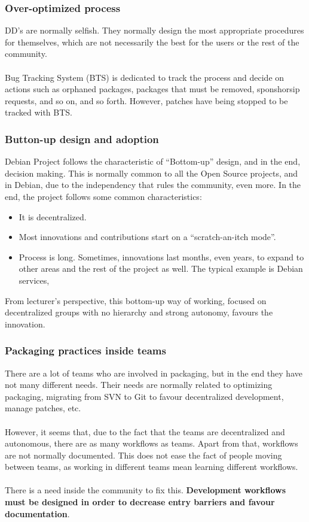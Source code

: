 \documentclass[11pt]{article}
\begin{document}
\subsubsection{Over-optimized process}
DD's are normally selfish. They normally design the most appropriate procedures for themselves, which are not necessarily the best for the users or the rest of the community.\\
\\
Bug Tracking System (BTS) is dedicated to track the process and decide on actions such as orphaned packages, packages that must be removed, sponshorsip requests, and so on, and so forth. However, patches have being stopped to be tracked with BTS.

\subsubsection{Button-up design and adoption}
Debian Project follows the characteristic of ``Bottom-up'' design, and in the end, decision making. This is normally common to all the Open Source projects, and in Debian, due to the independency that rules the community, even more. In the end, the project follows some common characteristics:
\begin{itemize}\itemsep0pt
\item{It is decentralized.}
\item{Most innovations and contributions start on a ``scratch-an-itch mode''.}
\item{Process is long.} Sometimes, innovations last months, even years, to expand to other areas and the rest of the project as well. The typical example is Debian services, 
\end{itemize}
From lecturer's perspective, this bottom-up way of working, focused on decentralized groups with no hierarchy and strong autonomy, favours the innovation.

\subsubsection{Packaging practices inside teams}
There are a lot of teams who are involved in packaging, but in the end they have not many different needs. Their needs are normally related to optimizing packaging, migrating from SVN to Git to favour decentralized development, manage patches, etc.\\
\\
However, it seems that, due to the fact that the teams are decentralized and autonomous, there are as many workflows as teams. Apart from that, workflows are not normally documented. This does not ease the fact of people moving between teams, as working in different teams mean learning different workflows.\\
\\
There is a need inside the community to fix this. \textbf{Development workflows must be designed in order to decrease entry barriers and favour documentation}.
\end{document}
